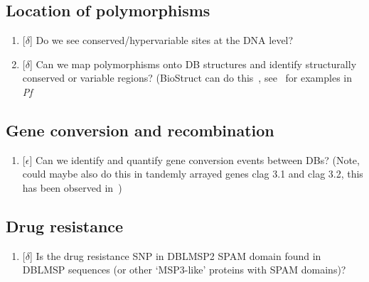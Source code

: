 \documentclass[12pt]{article}
\begin{document}
\subsection{Location of polymorphisms}
\begin{enumerate}
    \item{[$\delta$] Do we see conserved/hypervariable sites at the DNA level?}
    \item{[$\delta$] Can we map polymorphisms onto DB structures and identify
        structurally conserved or variable regions? (BioStruct can do
        this~\cite{Guy2018a}, see~\cite{Guy2018b} for examples in \textit{Pf}}
\end{enumerate}
\subsection{Gene conversion and recombination}
\begin{enumerate}
    \item{[$\epsilon$] Can we identify and quantify gene conversion events between DBs?
        (Note, could maybe also do this in tandemly arrayed genes clag 3.1 and clag 3.2,
        this has been observed in~\cite{Iriko2008})
        }
\end{enumerate}
\subsection{Drug resistance}
\begin{enumerate}
    \item{[$\delta$] Is the drug resistance SNP in DBLMSP2 SPAM domain found in DBLMSP
        sequences (or other `MSP3-like' proteins with SPAM domains)?
        }
\end{enumerate}



\clearpage
\printbibliography
\end{document}
